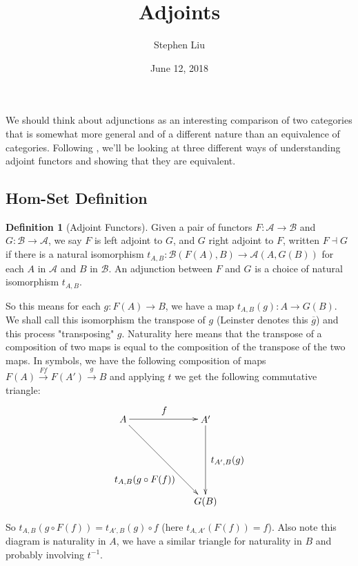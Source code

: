 \documentclass[11pt]{article}
\theoremstyle{definition}
\newtheorem*{defn}{Definition}
\theoremstyle{definition}
\theoremstyle{plain}
\theoremstyle{plain}
\theoremstyle{plain}
\begin{document}
\author{Stephen Liu}
\title{Adjoints}
\date{June 12, 2018}

\maketitle

We should think about adjunctions as an interesting comparison of two categories that is somewhat more general and of a different nature than an equivalence of categories. Following \cite{leinster_basic_2014}, we'll be looking at three different ways of understanding adjoint functors and showing that they are equivalent.

\subsection*{Hom-Set Definition}
\begin{defn}[Adjoint Functors]
Given a pair of functors $F:\mathscr{A}\to\mathscr{B}$ and $G:\mathscr{B}\to\mathscr{A}$, we say $F$ is left adjoint to $G$, and $G$ right adjoint to $F$, written $F \dashv G$ if there is a natural isomorphism $t_{A,B}:\mathscr{B}(F(A),B) \to \mathscr{A}(A,G(B))$ for each $A$ in $\mathscr{A}$ and $B$ in $\mathscr{B}$. An adjunction between $F$ and $G$ is a choice of natural isomorphism $t_{A,B}$.
\end{defn}

So this means for each $g:F(A) \to B$, we have a map $t_{A,B}(g): A \to G(B)$. We shall call this isomorphism the transpose of $g$ (Leinster denotes this $\overline{g}$) and this process "transposing" $g$. Naturality here means that the transpose of a composition of two maps is equal to the composition of the transpose of the two maps. In symbols, we have the following composition of maps $F(A) \overset{Ff}{\rightarrow} F(A') \overset{g}{\rightarrow} B$ and applying $t$ we get the following commutative triangle:

\begin{equation*}
\begin{xy}
(0,0)*+{A}="a"; (30, 0)*+{A'}="ap"; (30, -30)*+{G(B)}="gb";
{\ar "a";"ap"}?*!/_3mm/{f};
{\ar "ap";"gb"}?*!/_8mm/{t_{A',B}(g)};
{\ar "a";"gb"}?*!/^10mm/{t_{A,B}(g \circ F(f))}
\end{xy}
\end{equation*}

So $t_{A,B}(g \circ F(f)) = t_{A',B}(g) \circ f$ (here $t_{A,A'}(F(f)) = f$). Also note this diagram is naturality in $A$, we have a similar triangle for naturality in $B$ and probably involving $t^{-1}$.
\end{document}
